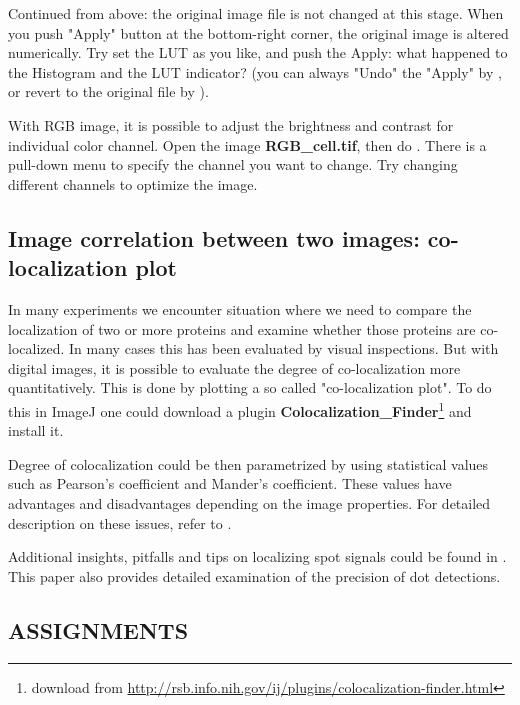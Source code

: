 \begin{indentexercise}{2}
Continued from above: the original image file
is not changed at this stage. When you push
"Apply" button at the bottom-right
corner, the original image is altered numerically. Try set the LUT as
you like, and push the Apply: what happened to the Histogram and the
LUT indicator? (you can always
"Undo" the "Apply" by , 
or revert to the original file by ).
\end{indentexercise}

\begin{indentexercise}{3}
With RGB image, it is possible to adjust the
brightness and contrast for individual color channel. Open the image
\textbf{RGB\_cell.tif}, then do . 
There is a pull-down menu to specify
the channel you want to change. Try changing different channels to
optimize the image. 
\end{indentexercise}

\subsection{Image correlation between two images: co-localization plot}

In many experiments we encounter situation where we need to compare the
localization of two or more proteins and examine whether those proteins
are co-localized. In many cases this has been evaluated by visual
inspections. But with digital images, it is possible to evaluate the
degree of co-localization more quantitatively. This is done by plotting
a so called "co-localization
plot". To do this in ImageJ one could download a
plugin \textbf{Colocalization\_Finder}\footnote{download from \url{http://rsb.info.nih.gov/ij/plugins/colocalization-finder.html}}
and install it.

Degree of colocalization could be then parametrized by using statistical
values such as Pearson's coefficient and
Mander's coefficient. These values have advantages and
disadvantages depending on the image properties. For detailed
description on these issues, refer to \citet*{BolteJM2006}.

Additional insights, pitfalls and tips on localizing spot signals could
be found in \citet{Waters2009}. This paper also provides detailed examination of the precision of dot detections. 
\clearpage

\subsection{ASSIGNMENTS}

